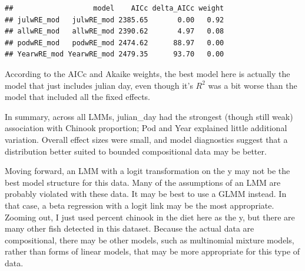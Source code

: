 \documentclass[
]{article}
\begin{document}
\begin{verbatim}
##                   model    AICc delta_AICc weight
## julwRE_mod   julwRE_mod 2385.65       0.00   0.92
## allwRE_mod   allwRE_mod 2390.62       4.97   0.08
## podwRE_mod   podwRE_mod 2474.62      88.97   0.00
## YearwRE_mod YearwRE_mod 2479.35      93.70   0.00
\end{verbatim}

According to the AICc and Akaike weights, the best model here is
actually the model that just includes julian day, even though it's
\(R^2\) was a bit worse than the model that included all the fixed
effects.

In summary, across all LMMs, julian\_day had the strongest (though still
weak) association with Chinook proportion; Pod and Year explained little
additional variation. Overall effect sizes were small, and model
diagnostics suggest that a distribution better suited to bounded
compositional data may be better.

Moving forward, an LMM with a logit transformation on the y may not be
the best model structure for this data. Many of the assumptions of an
LMM are probably violated with these data. It may be best to use a GLMM
instead. In that case, a beta regression with a logit link may be the
most appropriate. Zooming out, I just used percent chinook in the diet
here as the y, but there are many other fish detected in this dataset.
Because the actual data are compositional, there may be other models,
such as multinomial mixture models, rather than forms of linear models,
that may be more appropriate for this type of data.
\end{document}
